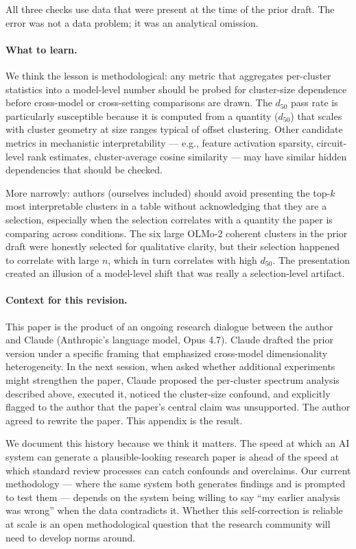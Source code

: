 \documentclass[11pt,letterpaper]{article}
\begin{document}
All three checks use data that were present at the time of the prior draft. The error was not a data problem; it was an analytical omission.

\paragraph{What to learn.} We think the lesson is methodological: any metric that aggregates per-cluster statistics into a model-level number should be probed for cluster-size dependence before cross-model or cross-setting comparisons are drawn. The $d_{50}$ pass rate is particularly susceptible because it is computed from a quantity ($d_{50}$) that scales with cluster geometry at size ranges typical of offset clustering. Other candidate metrics in mechanistic interpretability --- e.g., feature activation sparsity, circuit-level rank estimates, cluster-average cosine similarity --- may have similar hidden dependencies that should be checked.

More narrowly: authors (ourselves included) should avoid presenting the top-$k$ most interpretable clusters in a table without acknowledging that they are a selection, especially when the selection correlates with a quantity the paper is comparing across conditions. The six large OLMo-2 coherent clusters in the prior draft were honestly selected for qualitative clarity, but their selection happened to correlate with large $n$, which in turn correlates with high $d_{50}$. The presentation created an illusion of a model-level shift that was really a selection-level artifact.

\paragraph{Context for this revision.} This paper is the product of an ongoing research dialogue between the author and Claude (Anthropic's language model, Opus 4.7). Claude drafted the prior version under a specific framing that emphasized cross-model dimensionality heterogeneity. In the next session, when asked whether additional experiments might strengthen the paper, Claude proposed the per-cluster spectrum analysis described above, executed it, noticed the cluster-size confound, and explicitly flagged to the author that the paper's central claim was unsupported. The author agreed to rewrite the paper. This appendix is the result.

We document this history because we think it matters. The speed at which an AI system can generate a plausible-looking research paper is ahead of the speed at which standard review processes can catch confounds and overclaims. Our current methodology --- where the same system both generates findings and is prompted to test them --- depends on the system being willing to say ``my earlier analysis was wrong'' when the data contradicts it. Whether this self-correction is reliable at scale is an open methodological question that the research community will need to develop norms around.
\end{document}
